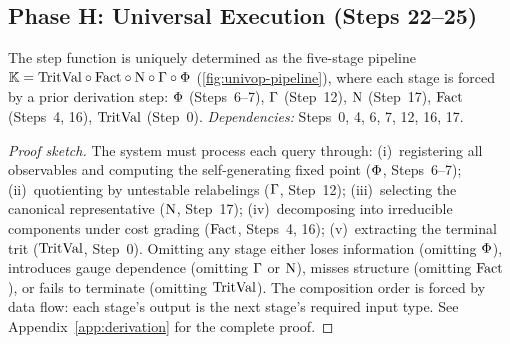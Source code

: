 \subsection{Phase H: Universal Execution (Steps 22--25)}
\label{sec:derivation:execution}

\begin{theorem}
\label{thm:univop-derivation}
The step function is uniquely determined as the five-stage pipeline
$\mathbb{K} = \mathrm{TritVal} \circ \mathrm{Fact} \circ \mathrm{N} \circ \Gamma \circ \Phi$
(\cref{fig:univop-pipeline}),
where each stage is forced by a prior derivation step:
$\Phi$ (Steps~6--7), $\Gamma$ (Step~12), $\mathrm{N}$ (Step~17),
$\mathrm{Fact}$ (Steps~4, 16), $\mathrm{TritVal}$ (Step~0).
\emph{Dependencies:} Steps~0, 4, 6, 7, 12, 16, 17.
\begin{proof}[Proof sketch]
The system must process each query through: (i)~registering all observables
and computing the self-generating fixed point ($\Phi$, Steps~6--7);
(ii)~quotienting by untestable relabelings ($\Gamma$, Step~12);
(iii)~selecting the canonical representative ($\mathrm{N}$, Step~17);
(iv)~decomposing into irreducible components under cost grading ($\mathrm{Fact}$,
Steps~4, 16); (v)~extracting the terminal trit ($\mathrm{TritVal}$, Step~0).
Omitting any stage either loses information (omitting $\Phi$),
introduces gauge dependence (omitting $\Gamma$ or $\mathrm{N}$), misses
structure (omitting $\mathrm{Fact}$), or fails to terminate (omitting $\mathrm{TritVal}$).
The composition order is forced by data flow: each stage's output is the
next stage's required input type.
See Appendix~\ref{app:derivation} for the complete proof.
\end{proof}
\end{theorem}



